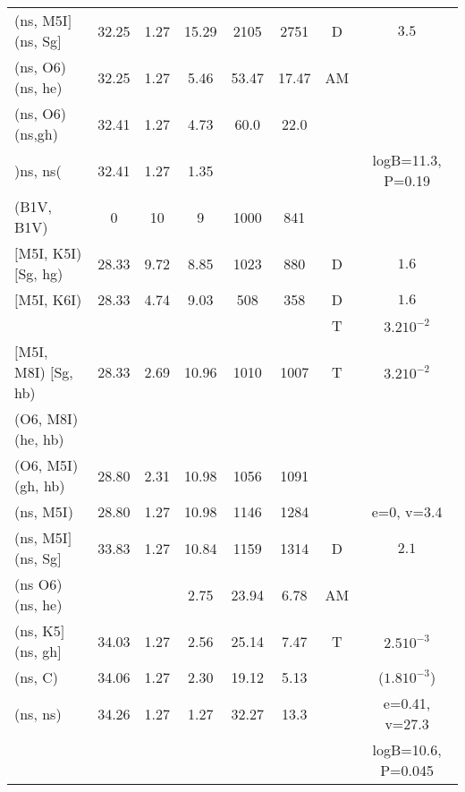 \documentclass{article}
\begin{document}
\begin{table}
\begin{tabular}{p{4cm}ccccccc}
(ns, M5I$]$ (ns, Sg$]$	& 32.25	& 1.27	& 15.29	& 2105	& 2751	& D	& $3.5$			\\
(ns, O6) (ns, he)	& 32.25	& 1.27	& 5.46	& 53.47	& 17.47	& AM	&			\\
(ns, O6) (ns,gh) 	& 32.41	& 1.27	& 4.73	& 60.0	& 22.0	&	&			\\
)ns, ns(	 	& 32.41	& 1.27	& 1.35	&	&	&	& logB=11.3, P=0.19 	\\ \hline
(B1V, B1V)       	& 0	& 10	& 9	& 1000	& 841	&	&			\\
$[$M5I, K5I) $[$Sg, hg)	& 28.33	& 9.72	& 8.85	& 1023	& 880	& D	& $1.6$			\\
$[$M5I, K6I)	 	& 28.33	& 4.74	& 9.03	& 508	& 358	& D	& $1.6$			\\
   		 	& 	& 	&	&	&	& T	& $3.2 10^{-2}$		\\
$[$M5I, M8I) $[$Sg, hb)	& 28.33	& 2.69	& 10.96	& 1010	& 1007	& T	& $3.2 10^{-2}$		\\
(O6, M8I) (he, hb)	& 	& 	&	&	&	&	&			\\
(O6, M5I) (gh, hb)	& 28.80	& 2.31	& 10.98 & 1056	& 1091	&	&			\\
(ns, M5I)	 	& 28.80	& 1.27	& 10.98	& 1146	& 1284	&	& e=0, v=3.4		\\
(ns, M5I$]$ (ns, Sg$]$	& 33.83	& 1.27	& 10.84	& 1159	& 1314	& D	& $2.1$			\\
(ns O6) (ns, he) 	& 	& 	& 2.75	& 23.94	& 6.78	& AM	&			\\
(ns, K5$]$ (ns, gh$]$	& 34.03	& 1.27	& 2.56	& 25.14	& 7.47	& T	& $2.5 10^{-3}$		\\
(ns, C) 	 	& 34.06	& 1.27	& 2.30	& 19.12	& 5.13	&	& ($1.8 10^{-3}$)	\\
(ns, ns)	 	& 34.26	& 1.27	& 1.27	& 32.27	& 13.3	& 	& e=0.41, v=27.3 	\\
			&	& 	&	&	&	& 	& logB=10.6, P=0.045 	\\ \hline
\end{tabular}
\end{table}
\end{document}
